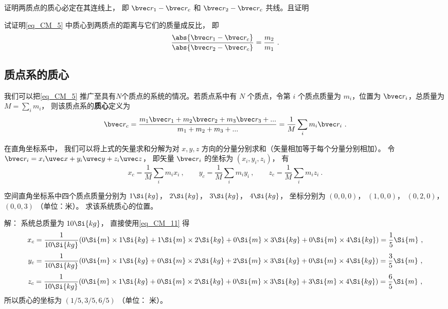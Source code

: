 \begin{exercise}{}
证明两质点的质心必定在其连线上， 即 $\bvec r_1 - \bvec r_c$ 和 $\bvec r_2 - \bvec r_c$ 共线。且证明%
\end{exercise}

\begin{exercise}{}
试证明\autoref{eq_CM_5} 中质心到两质点的距离与它们的质量成反比， 即
\begin{equation}\label{eq_CM_6}
\frac{\abs{\bvec r_1 - \bvec r_c}}{\abs{\bvec r_2 - \bvec r_c}} = \frac{m_2}{m_1}~.
\end{equation}
\end{exercise}

\subsection{质点系的质心}
我们可以把\autoref{eq_CM_5} 推广至具有$N$个质点的系统的情况。若质点系中有 $N$ 个质点，令第 $i$ 个质点质量为 $m_i$，位置为 $\bvec r_i$，总质量为 $M = \sum\limits_i m_i$， 则该质点系的\textbf{质心}定义为
\begin{equation}\label{eq_CM_1}
\bvec r_c = \frac{m_1 \bvec r_1 + m_2 \bvec r_2 + m_3 \bvec r_3 +... }{m_1 + m_2 +m_3+...}=\frac{1}{M}\sum_i m_i \bvec r_i~.
\end{equation}

在直角坐标系中， 我们可以将上式的矢量求和分解为对 $x, y, z$ 方向的分量分别求和（矢量相加等于每个分量分别相加）。 令 $\bvec r_i = x_i \uvec x + y_i \uvec y + z_i \uvec z$， 即矢量 $\bvec r_i$ 的坐标为 $(x_i, y_i, z_i)$， 有
\begin{equation}\label{eq_CM_11}
x_c = \frac{1}{M}\sum_i m_i x_i ~,\qquad
y_c = \frac{1}{M}\sum_i m_i y_i ~,\qquad
z_c = \frac{1}{M}\sum_i m_i z_i~.
\end{equation}

\begin{example}{}
空间直角坐标系中四个质点质量分别为 $1 \Si{kg}$， $2 \Si{kg}$， $3 \Si{kg}$， $4 \Si{kg}$， 坐标分别为 $(0, 0, 0)$， $(1, 0, 0)$， $(0, 2, 0)$， $(0, 0, 3)$ （单位：米）。 求该系统质心的位置。

解： 系统总质量为 $10 \Si{kg}$， 直接使用\autoref{eq_CM_11} 得
\begin{equation}
x_c = \frac{1}{10 \Si{kg}} (0 \Si{m} \times 1 \Si{kg} + 1 \Si{m}\times 2 \Si{kg} + 0\Si{m} \times 3 \Si{kg} + 0 \Si{m}\times 4 \Si{kg}) = \frac15 \Si{m}~,
\end{equation}
\begin{equation}
y_c = \frac{1}{10 \Si{kg}} (0\Si{m}\times 1 \Si{kg} + 0\Si{m} \times 2 \Si{kg} + 2\Si{m} \times 3 \Si{kg} + 0 \Si{m}\times 4 \Si{kg}) = \frac35 \Si{m}~,
\end{equation}
\begin{equation}
z_c = \frac{1}{10 \Si{kg}} (0\Si{m}\times 1 \Si{kg} + 0\Si{m} \times 2 \Si{kg} + 0\Si{m} \times 3 \Si{kg} + 3 \Si{m}\times 4 \Si{kg}) = \frac65 \Si{m}~,
\end{equation}
所以质心的坐标为 $(1/5, 3/5, 6/5)$ （单位： 米）。
\end{example}

